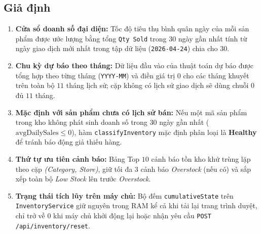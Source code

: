 \subsection*{Giả định}
\label{sec:assumptions}
\begin{enumerate}[label=\textit{\arabic*},topsep=0pt, itemsep=1pt]
	\item \textbf{Cửa sổ doanh số đại diện:} Tốc độ tiêu thụ bình quân ngày của mỗi sản phẩm được ước lượng bằng tổng \texttt{Qty Sold} trong $30$ ngày gần nhất tính từ ngày giao dịch mới nhất trong tập dữ liệu (\texttt{2026-04-24}) chia cho $30$.
	\item \textbf{Chu kỳ dự báo theo tháng:} Dữ liệu đầu vào của thuật toán dự báo được tổng hợp theo từng tháng (\texttt{YYYY-MM}) và điền giá trị $0$ cho các tháng khuyết trên toàn bộ $11$ tháng lịch sử; cặp không có lịch sử giao dịch sẽ dùng chuỗi $0$ đủ $11$ tháng.
	\item \textbf{Mặc định với sản phẩm chưa có lịch sử bán:} Nếu một mã sản phẩm trong kho không phát sinh doanh số trong $30$ ngày gần nhất ($\text{avgDailySales} \le 0$), hàm \texttt{classifyInventory} mặc định phân loại là \textbf{Healthy} để tránh báo động giả thiếu hàng.
	\item \textbf{Thứ tự ưu tiên cảnh báo:} Bảng Top $10$ cảnh báo tồn kho khử trùng lặp theo cặp \textit{(Category, Store)}, giữ tối đa $3$ cảnh báo \textit{Overstock} (nếu có) và sắp xếp toàn bộ \textit{Low Stock} lên trước \textit{Overstock}.
	\item \textbf{Trạng thái tích lũy trên máy chủ:} Bộ đếm \texttt{cumulativeState} trên \texttt{InventoryService} giữ nguyên trong RAM kể cả khi tải lại trang trình duyệt, chỉ trở về $0$ khi máy chủ khởi động lại hoặc nhận yêu cầu \texttt{POST /api/inventory/reset}.
\end{enumerate}
